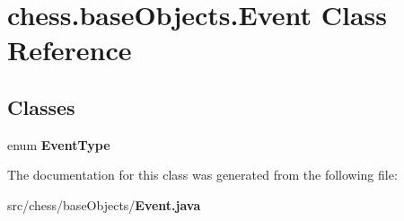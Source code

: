 \section{chess.\+base\+Objects.\+Event Class Reference}
\label{classchess_1_1base_objects_1_1_event}
\subsection*{Classes}
\begin{DoxyCompactItemize}
\item 
enum {\bfseries Event\+Type}
\end{DoxyCompactItemize}


The documentation for this class was generated from the following file\+:\begin{DoxyCompactItemize}
\item 
src/chess/base\+Objects/{\bf Event.\+java}\end{DoxyCompactItemize}
